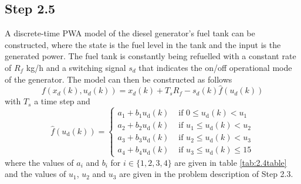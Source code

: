 \subsection*{Step 2.5}
A discrete-time PWA model of the diesel generator's fuel tank can be constructed, where the state is the fuel level in the tank and the input is the generated power. The fuel tank is constantly being refuelled with a constant rate of $R_f$ kg/h and a switching signal $s_d$ that indicates the on/off operational mode of the generator. The model can then be constructed as follows
\begin{equation}
f(x_d(k),u_d(k)) = x_d(k) + T_sR_f - s_d(k)\hat{f}(u_d(k)) \label{eq:PWA25}
\end{equation}
with $T_s$ a time step and
$$
\hat{f}\left(u_{\mathrm{d}}(k)\right)=\left\{\begin{array}{ll}
a_{1}+b_{1} u_{\mathrm{d}}(k) & \text { if } 0 \leq u_{\mathrm{d}}(k)<u_{1} \\
a_{2}+b_{2} u_{\mathrm{d}}(k) & \text { if } u_{1} \leq u_{\mathrm{d}}(k)<u_{2} \\
a_{3}+b_{3} u_{\mathrm{d}}(k) & \text { if } u_{2} \leq u_{\mathrm{d}}(k)<u_{3} \\
a_{4}+b_{4} u_{\mathrm{d}}(k) & \text { if } u_{3} \leq u_{\mathrm{d}}(k) \leq 15
\end{array}\right.
$$
where the values of $a_i$ and $b_i$ for $i \in \{1,2,3,4\}$ are given in table \ref{tab:2.4table} and the values of $u_1$, $u_2$ and $u_3$ are given in the problem description of Step 2.3.